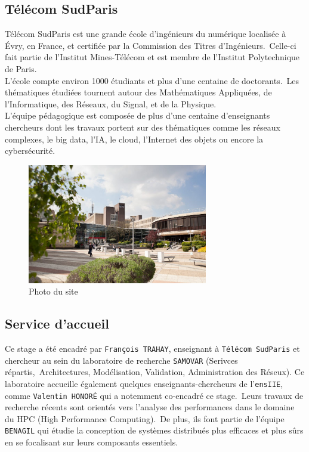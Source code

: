 
\subsection{Télécom SudParis}\label{ssec:introduction_nom_entreprise}

Télécom SudParis est une grande école d'ingénieurs du numérique localisée à Évry, en France, et certifiée par la Commission des Titres d'Ingénieurs.\
Celle-ci fait partie de l'Institut Mines-Télécom et est membre de l'Institut Polytechnique de Paris.\\
L'école compte environ 1000 étudiants et plus d'une centaine de doctorants.\
Les thématiques étudiées tournent autour des Mathématiques Appliquées, de l'Informatique, des Réseaux, du Signal, et de la Physique.\\
L'équipe pédagogique est composée de plus d'une centaine d'enseignants chercheurs dont les travaux portent sur des thématiques comme les
réseaux complexes, le big data, l'IA, le cloud, l'Internet des objets ou encore la cybersécurité.\

\begin{figure}[!h]
    \centering
    \includegraphics[width=0.7\textwidth]{img/campus_tsp.jpg}
    \caption{Photo du site}
    \label{fig:photo_site}
\end{figure}


\subsection{Service d'accueil}\label{ssec:introduction_service_accueil}

Ce stage a été encadré par \verb!François TRAHAY!, enseignant à \verb!Télécom SudParis! et chercheur au sein du laboratoire de recherche \verb!SAMOVAR! (Serivces répartis,\
Architectures, Modélisation, Validation, Administration des Réseux). Ce laboratoire accueille également quelques enseignants-chercheurs de l'\verb!ensIIE!, comme \verb!Valentin HONORÉ! qui a notemment co-encadré ce stage.\
Leurs travaux de recherche récents sont orientés vers l'analyse des performances dans le domaine du HPC (High Performance Computing).\
De plus, ils font partie de l'équipe \verb!BENAGIL! qui étudie la conception de systèmes distribués plus efficaces et plus sûrs en se focalisant sur leurs composants essentiels.

